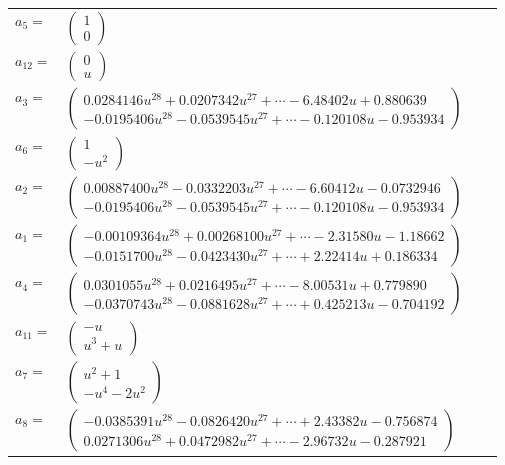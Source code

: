 \documentclass[1p]{elsarticle_modified}
\theoremstyle{definition}
\begin{document}
\begin{tabular}{m{7pt} m{180pt} m{7pt} m{180pt} }
\flushright $a_{5}=$&$\begin{pmatrix}1\\0\end{pmatrix}$ \\
\flushright $a_{12}=$&$\begin{pmatrix}0\\u\end{pmatrix}$ \\
\flushright $a_{3}=$&$\begin{pmatrix}0.0284146 u^{28}+0.0207342 u^{27}+\cdots-6.48402 u+0.880639\\-0.0195406 u^{28}-0.0539545 u^{27}+\cdots-0.120108 u-0.953934\end{pmatrix}$ \\
\flushright $a_{6}=$&$\begin{pmatrix}1\\- u^2\end{pmatrix}$ \\
\flushright $a_{2}=$&$\begin{pmatrix}0.00887400 u^{28}-0.0332203 u^{27}+\cdots-6.60412 u-0.0732946\\-0.0195406 u^{28}-0.0539545 u^{27}+\cdots-0.120108 u-0.953934\end{pmatrix}$ \\
\flushright $a_{1}=$&$\begin{pmatrix}-0.00109364 u^{28}+0.00268100 u^{27}+\cdots-2.31580 u-1.18662\\-0.0151700 u^{28}-0.0423430 u^{27}+\cdots+2.22414 u+0.186334\end{pmatrix}$ \\
\flushright $a_{4}=$&$\begin{pmatrix}0.0301055 u^{28}+0.0216495 u^{27}+\cdots-8.00531 u+0.779890\\-0.0370743 u^{28}-0.0881628 u^{27}+\cdots+0.425213 u-0.704192\end{pmatrix}$ \\
\flushright $a_{11}=$&$\begin{pmatrix}- u\\u^3+u\end{pmatrix}$ \\
\flushright $a_{7}=$&$\begin{pmatrix}u^2+1\\- u^4-2 u^2\end{pmatrix}$ \\
\flushright $a_{8}=$&$\begin{pmatrix}-0.0385391 u^{28}-0.0826420 u^{27}+\cdots+2.43382 u-0.756874\\0.0271306 u^{28}+0.0472982 u^{27}+\cdots-2.96732 u-0.287921\end{pmatrix}$ \\

\end{tabular}
\end{document}
